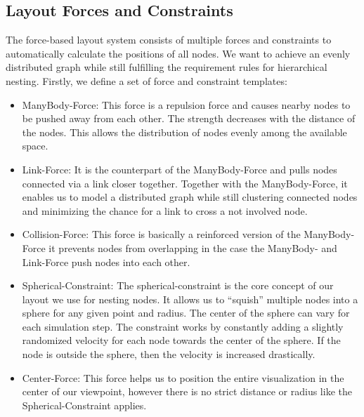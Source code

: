 \subsection{Layout Forces and Constraints}
\label{chap:ps-forces}
The force-based layout system consists of multiple forces and constraints to automatically calculate the positions of all nodes. We want to achieve an evenly distributed graph while still fulfilling the requirement rules for hierarchical nesting. Firstly, we define a set of force and constraint templates:
\begin{itemize}
    \item ManyBody-Force: This force is a repulsion force and causes nearby nodes to be pushed away from each other. The strength decreases with the distance of the nodes. This allows the distribution of nodes evenly among the available space.
    \item Link-Force: It is the counterpart of the ManyBody-Force and pulls nodes connected via a link closer together. Together with the ManyBody-Force, it enables us to model a distributed graph while still clustering connected nodes and minimizing the chance for a link to cross a not involved node.
    \item Collision-Force: This force is basically a reinforced version of the ManyBody-Force it prevents nodes from overlapping in the case the ManyBody- and Link-Force push nodes into each other.
    \item Spherical-Constraint: The spherical-constraint is the core concept of our layout we use for nesting nodes. It allows us to “squish” multiple nodes into a sphere for any given point and radius. The center of the sphere can vary for each simulation step. The constraint works by constantly adding a slightly randomized velocity for each node towards the center of the sphere. If the node is outside the sphere, then the velocity is increased drastically.
    \item Center-Force: This force helps us to position the entire visualization in the center of our viewpoint, however there is no strict distance or radius like the Spherical-Constraint applies.
\end{itemize}


